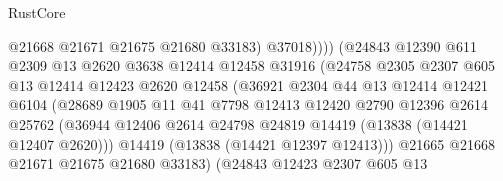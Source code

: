 \begin{lexlean}{RustCore}
\begin{coremodule}
                                      @21668
                                      @21671
                                      @21675
                                      @21680
                                      @33183)
                                    @37018))))
                            (@24843
                              @12390
                              @611
                              @2309
                              @13
                              @2620
                              @3638
                              @12414
                              @12458
                              @31916
                              (@24758
                                @2305
                                @2307
                                @605
                                @13
                                @12414
                                @12423
                                @2620
                                @12458
                                (@36921
                                  @2304
                                  @44
                                  @13
                                  @12414
                                  @12421
                                  @6104
                                  (@28689
                                    @1905
                                    @11
                                    @41
                                    @7798
                                    @12413
                                    @12420
                                    @2790
                                    @12396
                                    @2614
                                    @25762
                                    (@36944
                                      @12406
                                      @2614
                                      @24798
                                      @24819
                                      @14419
                                      (@13838 (@14421 @12407 @2620)))
                                    @14419
                                    (@13838 (@14421 @12397 @12413)))
                                  @21665
                                  @21668
                                  @21671
                                  @21675
                                  @21680
                                  @33183)
                                (@24843
                                  @12423
                                  @2307
                                  @605
                                  @13

\end{coremodule}
\end{lexlean}
